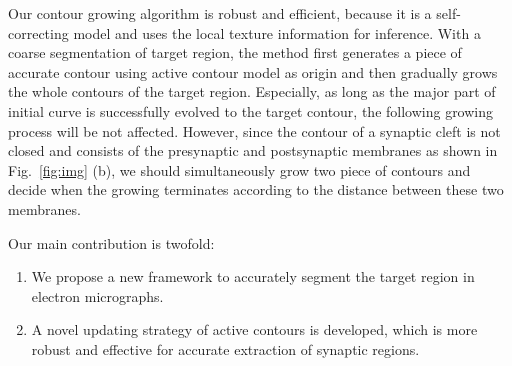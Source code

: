 Our contour growing algorithm is robust and efficient, because it is a self-correcting model and uses the local texture information for inference.
With a coarse segmentation of target region, the method first generates a piece of accurate contour using active contour model as origin and then gradually grows the whole contours of the target region.
Especially, as long as the major part of initial curve is successfully evolved to the target contour, the following growing process will be not affected.
%
However, since the contour of a synaptic cleft is not closed and consists of the presynaptic and postsynaptic membranes as shown in Fig.~\ref{fig:img} (b), we should simultaneously grow two piece of contours and decide when the growing terminates according to the distance between these two membranes.


Our main contribution is twofold:
\begin{enumerate}
	\item We propose a new framework to accurately segment the target region in electron micrographs.
	\item A novel updating strategy of active contours is developed, which is more robust and effective for accurate extraction of synaptic regions.
\end{enumerate}
